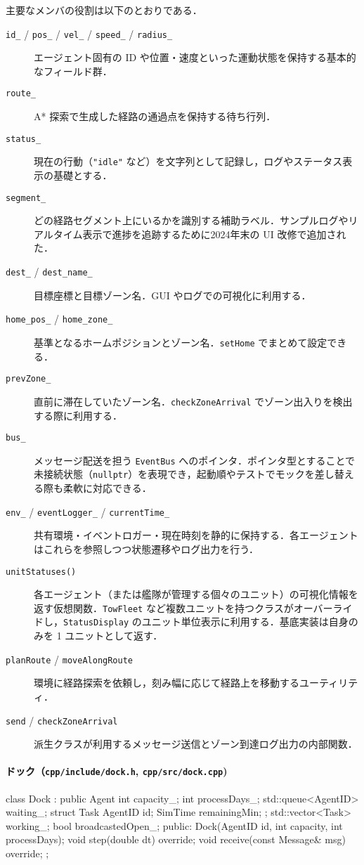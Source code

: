 \documentclass[10pt,letterpaper]{jsarticle}
\begin{document}
主要なメンバの役割は以下のとおりである．
\begin{description}
  \item[\texttt{id\_} / \texttt{pos\_} / \texttt{vel\_} / \texttt{speed\_} / \texttt{radius\_}] エージェント固有の ID や位置・速度といった運動状態を保持する基本的なフィールド群．
  \item[\texttt{route\_}] A* 探索で生成した経路の通過点を保持する待ち行列．
  \item[\texttt{status\_}] 現在の行動（\texttt{"idle"} など）を文字列として記録し，ログやステータス表示の基礎とする．
  \item[\texttt{segment\_}] どの経路セグメント上にいるかを識別する補助ラベル．サンプルログやリアルタイム表示で進捗を追跡するために2024年末の UI 改修で追加された．
  \item[\texttt{dest\_} / \texttt{dest\_name\_}] 目標座標と目標ゾーン名．GUI やログでの可視化に利用する．
  \item[\texttt{home\_pos\_} / \texttt{home\_zone\_}] 基準となるホームポジションとゾーン名．\texttt{setHome} でまとめて設定できる．
  \item[\texttt{prevZone\_}] 直前に滞在していたゾーン名．\texttt{checkZoneArrival} でゾーン出入りを検出する際に利用する．
  \item[\texttt{bus\_}] メッセージ配送を担う \texttt{EventBus} へのポインタ．ポインタ型とすることで未接続状態（\texttt{nullptr}）を表現でき，起動順やテストでモックを差し替える際も柔軟に対応できる．
  \item[\texttt{env\_} / \texttt{eventLogger\_} / \texttt{currentTime\_}] 共有環境・イベントロガー・現在時刻を静的に保持する．各エージェントはこれらを参照しつつ状態遷移やログ出力を行う．
  \item[\texttt{unitStatuses()}] 各エージェント（または艦隊が管理する個々のユニット）の可視化情報を返す仮想関数．\texttt{TowFleet} など複数ユニットを持つクラスがオーバーライドし，\texttt{StatusDisplay} のユニット単位表示に利用する．基底実装は自身のみを 1 ユニットとして返す．
  \item[\texttt{planRoute} / \texttt{moveAlongRoute}] 環境に経路探索を依頼し，刻み幅に応じて経路上を移動するユーティリティ．
  \item[\texttt{send} / \texttt{checkZoneArrival}] 派生クラスが利用するメッセージ送信とゾーン到達ログ出力の内部関数．
\end{description}

\paragraph{ドック（\texttt{cpp/include/dock.h}, \texttt{cpp/src/dock.cpp})}
\begin{cppcode}
class Dock : public Agent {
    int capacity_;
    int processDays_;
    std::queue<AgentID> waiting_;
    struct Task { AgentID id; SimTime remainingMin; };
    std::vector<Task> working_;
    bool broadcastedOpen_;
public:
    Dock(AgentID id, int capacity, int processDays);
    void step(double dt) override;
    void receive(const Message& msg) override;
};
\end{cppcode}
\end{document}
